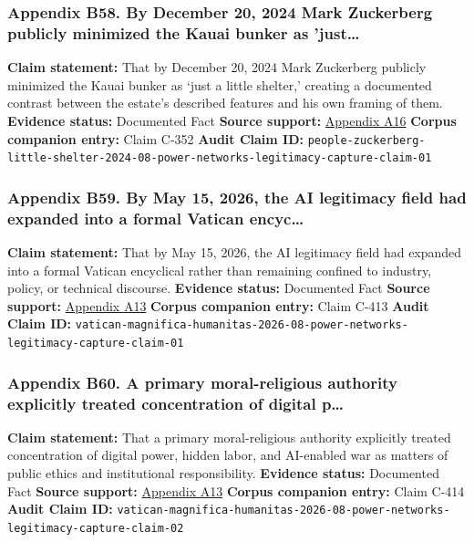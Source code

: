 \documentclass[
  american,
  11pt,
  letterpaper,
]{article}
\begin{document}
\subsubsection{Appendix B58. By December 20, 2024 Mark Zuckerberg
publicly minimized the Kauai bunker as
'just\ldots{}}\label{appendix-b58-by-december-20-2024-mark-zuckerberg-publicly-minimized-the-kauai-bunker-as-just}

\textbf{Claim statement:} That by December 20, 2024 Mark Zuckerberg
publicly minimized the Kauai bunker as `just a little shelter,' creating
a documented contrast between the estate's described features and his
own framing of them. \textbf{Evidence status:} Documented Fact
\textbf{Source support:}
\hyperref[appendix-a16-mark-zuckerberg-downplays-his-5-000-square-foot-underground-bunker-in-hawaii-just-a-little-shelter]{Appendix
A16} \textbf{Corpus companion entry:} Claim C-352 \textbf{Audit Claim
ID:}
\texttt{people-zuckerberg-little-shelter-2024-08-power-networks-legitimacy-capture-claim-01}

\subsubsection{Appendix B59. By May 15, 2026, the AI legitimacy field
had expanded into a formal Vatican
encyc\ldots{}}\label{appendix-b59-by-may-15-2026-the-ai-legitimacy-field-had-expanded-into-a-formal-vatican-encyc}

\textbf{Claim statement:} That by May 15, 2026, the AI legitimacy field
had expanded into a formal Vatican encyclical rather than remaining
confined to industry, policy, or technical discourse. \textbf{Evidence
status:} Documented Fact \textbf{Source support:}
\hyperref[appendix-a13-encyclical-letter-of-his-holiness-leo-xiv-magnifica-humanitas]{Appendix
A13} \textbf{Corpus companion entry:} Claim C-413 \textbf{Audit Claim
ID:}
\texttt{vatican-magnifica-humanitas-2026-08-power-networks-legitimacy-capture-claim-01}

\subsubsection{Appendix B60. A primary moral-religious authority
explicitly treated concentration of digital
p\ldots{}}\label{appendix-b60-a-primary-moral-religious-authority-explicitly-treated-concentration-of-digital-p}

\textbf{Claim statement:} That a primary moral-religious authority
explicitly treated concentration of digital power, hidden labor, and
AI-enabled war as matters of public ethics and institutional
responsibility. \textbf{Evidence status:} Documented Fact \textbf{Source
support:}
\hyperref[appendix-a13-encyclical-letter-of-his-holiness-leo-xiv-magnifica-humanitas]{Appendix
A13} \textbf{Corpus companion entry:} Claim C-414 \textbf{Audit Claim
ID:}
\texttt{vatican-magnifica-humanitas-2026-08-power-networks-legitimacy-capture-claim-02}
\end{document}
